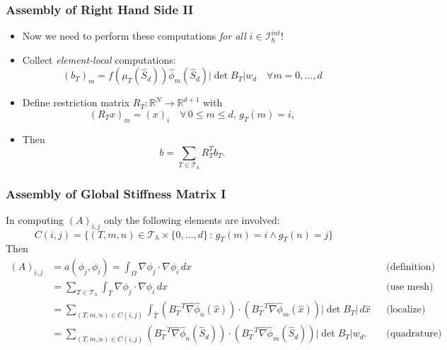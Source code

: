 \documentclass[aspectratio=169,11pt]{beamer}
\theoremstyle{definition}
\begin{document}
\begin{frame}
\frametitle{Assembly of Right Hand Side II}
\begin{itemize}
\item Now we need to perform these computations {\em for all $i\in\mathcal{I}_h^{int}$}!
\item Collect {\em element-local} computations:
\begin{equation*}
(b_T)_m =  f(\mu_T(\hat S_d)) \hat\phi_m(\hat S_d) |\det B_T| w_d \quad \forall m=0,\ldots,d
\end{equation*}
\item Define {restriction matrix} $R_T : \mathbb{R}^N \to \mathbb{R}^{d+1}$ with
\begin{equation*}
(R_T x)_m = (x)_i \quad \forall \,0\leq m \leq d, \,g_T(m)=i,
\end{equation*}
\item Then
\begin{equation*}
b = \sum_{T\in\mathcal{T}_h} R_T^T b_T .
\end{equation*}
\end{itemize}
\end{frame}

\begin{frame}
\frametitle{Assembly of Global Stiffness Matrix I}
In computing $(A)_{i,j}$ only the following elements are involved:
$$C(i,j) = \{(T,m,n)\in\mathcal{T}_h\times\{0,\ldots,d\} \,:\, g_T(m)=i \wedge g_T(n)=j\}$$
Then
{\small\begin{align*}
(A)_{i,j} &= a(\phi_j,\phi_i) = \int_\Omega \nabla \phi_j \cdot \nabla \phi_i \,dx
&&\text{(definition)}\\
&= \sum_{T\in\mathcal{T}_h} \int_T \nabla \phi_j \cdot \nabla \phi_i \,dx
&&\text{(use mesh)}\\
&= \sum_{(T,m,n)\in C(i,j)}
\int_{\hat T} (B_T^{-T} \hat\nabla\hat\phi_n(\hat x))\cdot (B_T^{-T} \hat\nabla\hat\phi_m(\hat x))
|\det B_T| \,d\hat x &&\text{(localize)}\\
&= \sum_{(T,m,n)\in C(i,j)}
(B_T^{-T} \hat\nabla\hat\phi_n(\hat S_d))\cdot (B_T^{-T} \hat\nabla\hat\phi_m(\hat S_d))
|\det B_T| w_d . &&\text{(quadrature)}
\end{align*}}
\end{frame}
\end{document}
